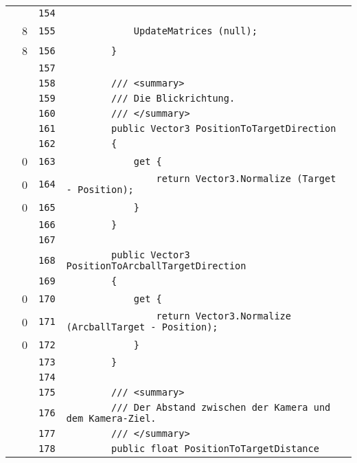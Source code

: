 \documentclass[a4paper,10pt]{article}
\begin{document}
\begin{longtable}[l]{lrrl}
\cellcolor{gray} &  & \verb~154~ & \verb~~\\
\cellcolor{green} & 8 & \verb~155~ & \verb~            UpdateMatrices (null);~\\
\cellcolor{green} & 8 & \verb~156~ & \verb~        }~\\
\cellcolor{gray} &  & \verb~157~ & \verb~~\\
\cellcolor{gray} &  & \verb~158~ & \verb~        /// <summary>~\\
\cellcolor{gray} &  & \verb~159~ & \verb~        /// Die Blickrichtung.~\\
\cellcolor{gray} &  & \verb~160~ & \verb~        /// </summary>~\\
\cellcolor{gray} &  & \verb~161~ & \verb~        public Vector3 PositionToTargetDirection~\\
\cellcolor{gray} &  & \verb~162~ & \verb~        {~\\
\cellcolor{red} & 0 & \verb~163~ & \verb~            get {~\\
\cellcolor{red} & 0 & \verb~164~ & \verb~                return Vector3.Normalize (Target - Position);~\\
\cellcolor{red} & 0 & \verb~165~ & \verb~            }~\\
\cellcolor{gray} &  & \verb~166~ & \verb~        }~\\
\cellcolor{gray} &  & \verb~167~ & \verb~~\\
\cellcolor{gray} &  & \verb~168~ & \verb~        public Vector3 PositionToArcballTargetDirection~\\
\cellcolor{gray} &  & \verb~169~ & \verb~        {~\\
\cellcolor{red} & 0 & \verb~170~ & \verb~            get {~\\
\cellcolor{red} & 0 & \verb~171~ & \verb~                return Vector3.Normalize (ArcballTarget - Position);~\\
\cellcolor{red} & 0 & \verb~172~ & \verb~            }~\\
\cellcolor{gray} &  & \verb~173~ & \verb~        }~\\
\cellcolor{gray} &  & \verb~174~ & \verb~~\\
\cellcolor{gray} &  & \verb~175~ & \verb~        /// <summary>~\\
\cellcolor{gray} &  & \verb~176~ & \verb~        /// Der Abstand zwischen der Kamera und dem Kamera-Ziel.~\\
\cellcolor{gray} &  & \verb~177~ & \verb~        /// </summary>~\\
\cellcolor{gray} &  & \verb~178~ & \verb~        public float PositionToTargetDistance~\\

\end{longtable}
\end{document}
